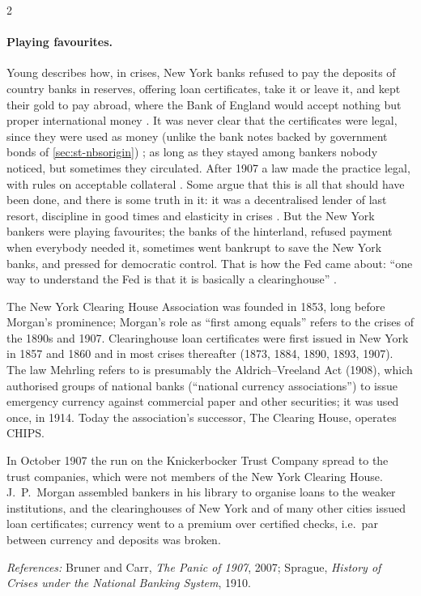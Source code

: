 \begin{paracol}{2}
\paragraph{Playing favourites.} Young describes how, in crises, New York banks refused to pay the deposits of country banks in reserves, offering loan
certificates, take it or leave it, and kept their gold to pay abroad, where the Bank of England would accept nothing but proper international money
. It was never clear that the certificates were legal, since they were used as money (unlike the bank notes
backed by government bonds of \cref{sec:st-nbsorigin}) ; as long as they stayed among bankers nobody noticed, but sometimes
they circulated. After 1907 a law made the practice legal, with rules on acceptable collateral . Some argue that this is all
that should have been done, and there is some truth in it: it was a decentralised lender of last resort, discipline in good times and elasticity in
crises . But the New York bankers were playing favourites; the banks of the hinterland, refused payment when
everybody needed it, sometimes went bankrupt to save the New York banks, and pressed for democratic control. That is how the Fed came about: ``one way to
understand the Fed is that it is basically a clearinghouse'' .

\begin{coursenote}
The New York Clearing House Association was founded in 1853, long before Morgan's prominence; Morgan's role as ``first among equals'' refers to the
crises of the 1890s and 1907. Clearinghouse loan certificates were first issued in New York in 1857 and 1860 and in most crises thereafter (1873, 1884,
1890, 1893, 1907). The law Mehrling refers to is presumably the Aldrich--Vreeland Act (1908), which authorised groups of national banks
(``national currency associations'') to issue emergency currency against commercial paper and other securities; it was used once, in 1914. Today the
association's successor, The Clearing House, operates CHIPS.
\end{coursenote}\begin{history}
In October 1907 the run on the Knickerbocker Trust Company spread to the trust companies, which were not members of the New York Clearing House. J.~P.~Morgan
assembled bankers in his library to organise loans to the weaker institutions, and the clearinghouses of New York and of many other cities issued loan
certificates; currency went to a premium over certified checks, i.e.\ par between currency and deposits was broken.\par
\emph{References:} Bruner and Carr, \emph{The Panic of 1907}, 2007; Sprague, \emph{History of Crises under the National Banking System}, 1910.
\end{history}


\end{paracol}
